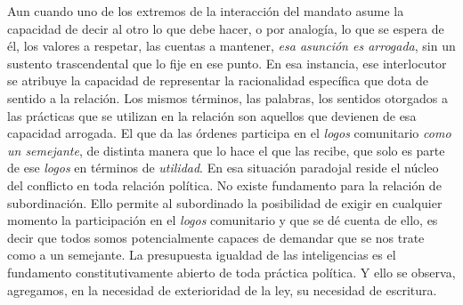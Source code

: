 Aun cuando uno de los extremos de la interacción del mandato asume la capacidad de decir al otro lo que debe hacer, o por analogía, lo que se espera de él, los valores a respetar, las cuentas a mantener, \emph{esa asunción es arrogada}, sin un sustento trascendental que lo fije en ese punto. En esa instancia, ese interlocutor se atribuye la capacidad de representar la racionalidad específica que dota de sentido a la relación. Los mismos términos, las palabras, los sentidos otorgados a las prácticas que se utilizan en la relación son aquellos que devienen de esa capacidad arrogada. El que da las órdenes participa en el \emph{logos} comunitario \emph{como un semejante}, de distinta manera que lo hace el que las recibe, que solo es parte de ese \emph{logos} en términos de \emph{utilidad}. En esa situación paradojal reside el núcleo del conflicto en toda relación política. No existe fundamento para la relación de subordinación. Ello permite al subordinado la posibilidad de exigir en cualquier momento la participación en el \emph{logos} comunitario y que se dé cuenta de ello, es decir que todos somos potencialmente capaces de demandar que se nos trate como a un semejante. La presupuesta igualdad de las inteligencias es el fundamento constitutivamente abierto de toda práctica política. Y ello se observa, agregamos, en la necesidad de exterioridad de la ley, su necesidad de escritura.

